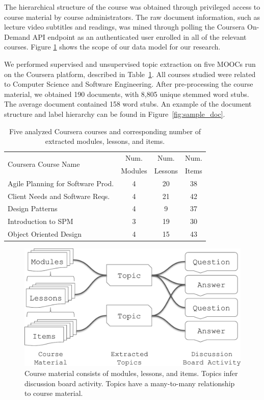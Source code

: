 \documentclass[sigconf, nonacm=true]{acmart}
\begin{document}
The hierarchical structure of the course was obtained through privileged access to course material by course administrators.
The raw document information, such as lecture video subtitles and readings, was mined through polling the Coursera On-Demand API endpoint as an authenticated user enrolled in all of the relevant courses.
Figure \ref{fig:data_model} shows the scope of our data model for our research.

We performed supervised and unsupervised topic extraction on five
MOOCs run on the Coursera platform, described in Table~\ref{tab:uofa-courses}.
All courses studied were related to Computer Science and Software Engineering.
After pre-processing the course material, we obtained 190 documents, with 8,805 unique stemmed word stubs.
The average document contained 158 word stubs.
An example of the document structure and label hierarchy can be found in Figure~\ref{fig:sample_doc}.

\begin{table}
\begin{tabularx}{\columnwidth}{@{}p{}ccc@{}}
    \toprule
    \multirow{2}{*}{Coursera Course Name} & Num. & Num. & Num. \\
    & Modules & Lessons & Items \\
    \midrule
    Agile Planning for Software Prod. & 4 & 20 & 38 \\
    Client Needs and Software Reqs. & 4 & 21 & 42 \\
    Design Patterns & 4 & 9 & 37 \\
    Introduction to SPM & 3 & 19 & 30 \\
    Object Oriented Design & 4 & 15 & 43 \\
    \bottomrule
\end{tabularx}
\caption{Five analyzed Coursera courses and corresponding number of extracted modules, lessons, and items.}
\label{tab:uofa-courses}
\end{table}

\begin{figure}
    \centering
    \includegraphics[width=\columnwidth]{figures/data_model}
    \caption{Course material consists of modules, lessons, and items. Topics infer discussion board activity. Topics have a many-to-many relationship to course material.}
    \label{fig:data_model}
\end{figure}
\end{document}
